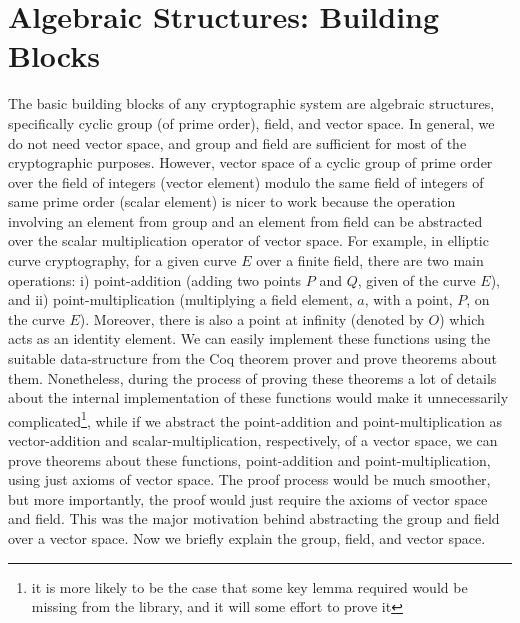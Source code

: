 \section{Algebraic Structures: Building Blocks}
\label{sec:algebra}
The basic building blocks of any cryptographic system are algebraic structures, specifically cyclic group (of prime order), field, and vector space. In general, 
we do not need vector space, and group and field are sufficient for most of the cryptographic purposes. However,
vector space  of a cyclic group of prime order over the field of integers (vector element) modulo the same field of integers of same prime order (scalar element)
is nicer to work because the operation involving an element from group and an element from field can be abstracted over 
the scalar multiplication operator of vector space.   For example,  in elliptic curve cryptography,  for a given curve $E$ over a finite field,   
there are two main operations: i) point-addition (adding two points $P$ and $Q$, given of the curve $E$),  and ii) point-multiplication (multiplying a field element, 
$a$, with a point, $P$, on the curve $E$).  Moreover,  there is also a point at infinity (denoted by $O$) which acts as an identity element.   
We can easily implement these functions using the suitable data-structure from the Coq theorem prover and prove theorems about them.  
Nonetheless,  during the process of proving these theorems a lot of details about 
the internal implementation of these functions would make it unnecessarily complicated\footnote{it is more likely to be the case that some key lemma required would be missing from the library,  
and it will some effort to prove it}, while if we abstract the point-addition and   point-multiplication as  vector-addition and scalar-multiplication, respectively, 
of a vector space, we can prove theorems about these functions,   point-addition and  point-multiplication, using just axioms of vector space.  
The proof process would be much smoother,  but more importantly, the proof would just require the axioms of vector space and field.
This was the major motivation behind abstracting the group and field over a vector space.  Now we briefly explain the group, field, and vector space. 

